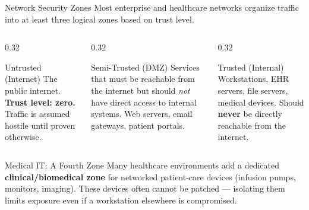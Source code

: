 \documentclass[aspectratio=169]{beamer}  %
\begin{document}
\begin{frame}{Network Security Zones}
    \footnotesize
    Most enterprise and healthcare networks organize traffic into at least three logical zones based on trust level.

    \vspace{0.3em}
    \begin{columns}[T]
        \begin{column}{0.32\textwidth}
            \begin{alertblock}{Untrusted (Internet)}
                \footnotesize
                The public internet. \textbf{Trust level: zero.} Traffic is assumed hostile until proven otherwise.
            \end{alertblock}
        \end{column}
        \begin{column}{0.32\textwidth}
            \begin{block}{Semi-Trusted (DMZ)}
                \footnotesize
                Services that must be reachable from the internet but should \emph{not} have direct access to internal systems. Web servers, email gateways, patient portals.
            \end{block}
        \end{column}
        \begin{column}{0.32\textwidth}
            \begin{exampleblock}{Trusted (Internal)}
                \footnotesize
                Workstations, EHR servers, file servers, medical devices. Should \textbf{never} be directly reachable from the internet.
            \end{exampleblock}
        \end{column}
    \end{columns}

    \vspace{0.3em}
    \begin{alertblock}{Medical IT: A Fourth Zone}
        \footnotesize
        Many healthcare environments add a dedicated \textbf{clinical/biomedical zone} for networked patient-care devices (infusion pumps, monitors, imaging). These devices often cannot be patched --- isolating them limits exposure even if a workstation elsewhere is compromised.
    \end{alertblock}
\end{frame}
\end{document}
